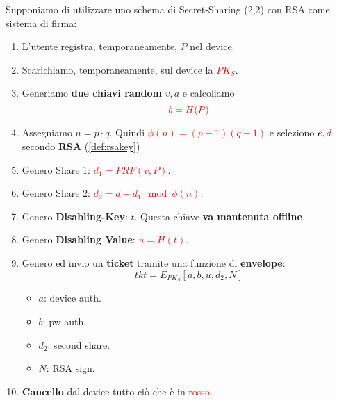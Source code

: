 \begin{corollary}\label{def:captureboost}
Supponiamo di utilizzare uno schema di Secret-Sharing (2,2) con RSA come sistema di firma:
\begin{enumerate}
        \item L'utente registra, temporaneamente, \textcolor{red}{$P$} nel device. 
        \item Scarichiamo, temporaneamente, sul device la \textcolor{red}{$PK_S$}.
        \item Generiamo \textbf{due chiavi random} $v,a$ e calcoliamo
        \[\textcolor{red}{b=H(P)}\]
        \item Assegniamo $n=p\cdot q$. Quindi \textcolor{red}{$\phi(n)=(p-1)(q-1)$} e seleziono $e,\textcolor{red}{d}$ secondo \textbf{RSA} (\cref{def:rsakey})
        \item Genero Share 1: \textcolor{red}{$d_1=PRF(v,P)$}.\footnotemark
        \item Genero Share 2: \textcolor{red}{$d_2=d-d_1\mod\phi(n)$}.
        \item Genero \textbf{Disabling-Key}: $t$. Questa chiave \textbf{va mantenuta offline}.
        \item Genero \textbf{Disabling Value}: \textcolor{red}{$u=H(t)$}.
        \item Genero ed invio un \textbf{ticket} tramite una funzione di \textbf{envelope}:
        \[tkt=E_{PK_S}[a,b,u,d_2,N]\]
        \begin{itemize}
            \item $a$: device auth.
            \item $b$: pw auth.
            \item $d_2$: second share.
            \item $N$: RSA sign.
        \end{itemize}
        \item \textbf{Cancello} dal device tutto ciò che è in \textcolor{red}{rosso}.
    \end{enumerate}
\end{corollary}\pagebreak
